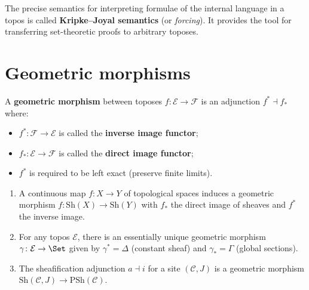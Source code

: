 \begin{remark}\label{rem:kripke-joyal}
The precise semantics for interpreting formulae of the internal language
in a topos is called \textbf{Kripke--Joyal semantics} (or \emph{forcing}).
It provides the tool for transferring set-theoretic proofs to arbitrary
toposes.
\end{remark}



\section{Geometric morphisms}\label{sec:geometric-morphisms}


\begin{definition}\label{def:geometric-morphism}
A \textbf{geometric morphism} between toposes
$f\colon\mathcal{E}\to\mathcal{F}$ is an adjunction $f^*\dashv f_*$
where:
\begin{itemize}
\item $f^*\colon\mathcal{F}\to\mathcal{E}$ is called the \textbf{inverse
      image functor};
\item $f_*\colon\mathcal{E}\to\mathcal{F}$ is called the \textbf{direct
      image functor};
\item $f^*$ is required to be left exact (preserve finite limits).
\end{itemize}
\end{definition}

\begin{example}\label{ex:geometric-morphisms}
\begin{enumerate}[label=(\roman*)]
\item A continuous map $f\colon X\to Y$ of topological spaces induces
      a geometric morphism $f\colon\mathrm{Sh}(X)\to\mathrm{Sh}(Y)$
      with $f_*$ the direct image of sheaves and $f^*$ the inverse
      image.
\item For any topos $\mathcal{E}$, there is an essentially unique
      geometric morphism $\gamma\colon\mathcal{E}\to\Set$ given by
      $\gamma^* = \Delta$ (constant sheaf) and $\gamma_* = \Gamma$
      (global sections).
\item The sheafification adjunction $a\dashv i$ for a site $(\mathcal{C},J)$
      is a geometric morphism
      $\mathrm{Sh}(\mathcal{C},J)\to\mathrm{PSh}(\mathcal{C})$.
\end{enumerate}
\end{example}

